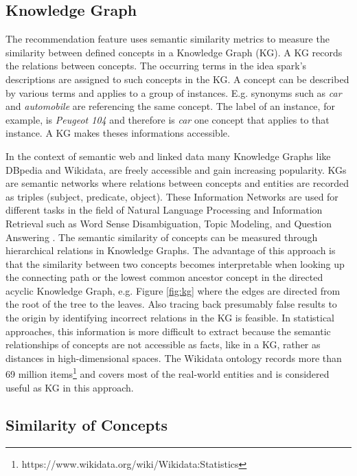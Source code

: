\documentclass[pdftex,a4paper,12pt]{scrartcl}
\theoremstyle{definition}
\begin{document}
\subsection{Knowledge Graph} \label{sec:KG}
    The recommendation feature uses semantic similarity metrics to measure the similarity between defined concepts in a Knowledge Graph (KG). A KG records the relations between concepts. The occurring terms in the idea spark's descriptions are assigned to such concepts in the KG. A concept can be described by various terms and applies to a group of instances. E.g. synonyms such as \textit{car} and \textit{automobile} are referencing the same concept. The label of an instance, for example, is \textit{Peugeot 104} and therefore is \textit{car} one concept that applies to that instance. A KG makes theses informations accessible.

    In the context of semantic web and linked data many Knowledge Graphs like DBpedia and Wikidata, are freely accessible and gain increasing popularity. KGs are semantic networks where relations between concepts and entities are recorded as triples (subject, predicate, object). These Information Networks are used for different tasks in the field of Natural Language Processing and Information Retrieval such as Word Sense Disambiguation, Topic Modeling, and Question Answering \citep{nastase_topic-driven_2008}. 
    The semantic similarity of concepts can be measured through hierarchical relations in Knowledge Graphs. The advantage of this approach is that the similarity between two concepts becomes interpretable when looking up the connecting path or the lowest common ancestor concept in the directed acyclic Knowledge Graph, e.g. Figure \ref{fig:kg} where the edges are directed from the root of the tree to the leaves. Also tracing back presumably false results to the origin by identifying incorrect relations in the KG is feasible. In statistical approaches, this information is more difficult to extract because the semantic relationships of concepts are not accessible as facts, like in a KG, rather as distances in high-dimensional spaces.  
    The Wikidata ontology records more than 69 million items\footnote{https://www.wikidata.org/wiki/Wikidata:Statistics} and covers most of the real-world entities and is considered useful as KG in this approach. 

\subsection{Similarity of Concepts}\label{similarity}
\end{document}
